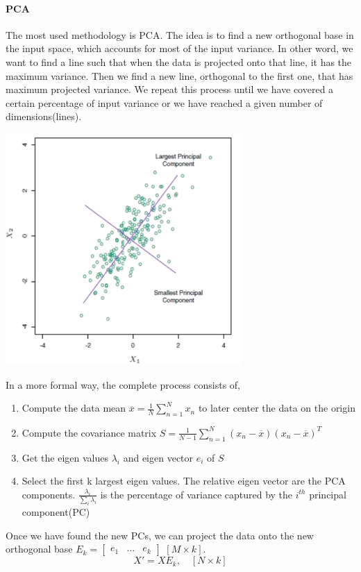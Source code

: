\documentclass[../main.tex]{subfiles}
\begin{document}
\paragraph{PCA} The most used methodology is PCA. The idea is to find a new orthogonal base in the input space, which accounts for most of the input variance. In other word, we want to find a line such that when the data is projected onto that line, it has the maximum variance. Then we find a new line, orthogonal to the first one, that has maximum projected variance. We repeat this process until we have covered a certain percentage of input variance or we have reached a given number of dimensions(lines).
\begin{center}
    \includegraphics[width=90mm]{images/PCA.png} \\
\end{center}
In a more formal way, the complete process consists of,
\begin{enumerate}
    \item Compute the data mean $\overline{x} = \frac{1}{N} \sum_{n=1}^N x_n$ to later center the data on the origin
    \item Compute the covariance matrix $S = \frac{1}{N-1} \sum_{n=1}^N (x_n-\overline{x})(x_n-\overline{x})^T$
    \item Get the eigen values $\lambda_i$ and eigen vector $e_i$ of $S$
    \item Select the first k largest eigen values. The relative eigen vector are the PCA components. $\frac{\lambda_i}{\sum_i \lambda_i}$ is the percentage of variance captured by the $i^{th}$ principal component(PC)
\end{enumerate}
Once we have found the new PCs, we can project the data onto the new orthogonal base $E_k = \begin{bmatrix} e_1 & \dots & e_k \end{bmatrix}$ $[M \times k]$.
\begin{equation}
    X'=XE_k, \quad [N \times k]
\end{equation}
\end{document}
